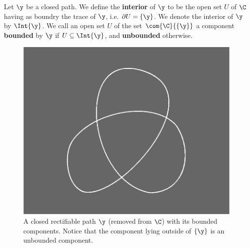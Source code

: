 \begin{definition}
    Let $\y$ be a closed path. We define the \textbf{interior} of $\y$ to be the
    open set  $U$ of $\C$ having as boundry the trace  of $\y$, i.e.
    $\partial{U}=\{\y\}$. We denote the interior of $\y$ by $\Int{\y}$. We call
    an open set $U$ of the set $\com{\C}{\{\y\}}$ a component \textbf{bounded}
    by $\y$ if $U \subseteq \Int{\y}$, and \textbf{unbounded} otherwise.
\end{definition}

\begin{figure}[h]
    \centering
    \includegraphics[scale=0.5]{Figures/chapter4/bounded_components.eps}
    \caption{A closed rectifiable path $\y$ (removed from $\C$) with its
        bounded components. Notice that the component lying outside of
    $\{\y\}$ is an unbounded component.}
    \label{fugure_4.2}
\end{figure}

